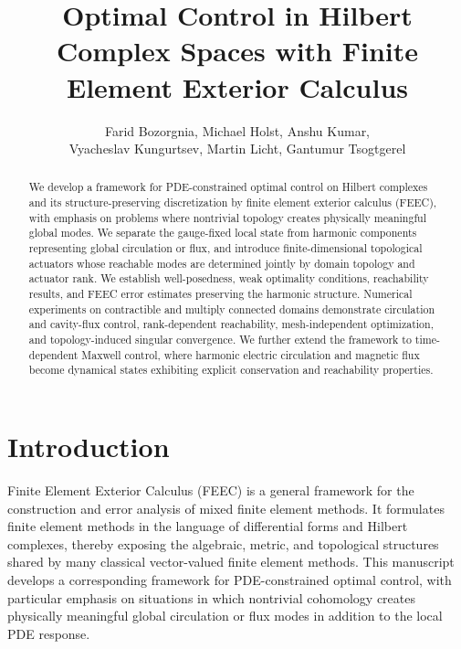 \documentclass{article}
\title{Optimal Control in Hilbert Complex Spaces with Finite Element Exterior Calculus}
\author{Farid Bozorgnia, Michael Holst, Anshu Kumar, \\ Vyacheslav Kungurtsev, Martin Licht, Gantumur Tsogtgerel}
\begin{document}
\maketitle

\begin{abstract}
We develop a framework for PDE-constrained optimal control on Hilbert complexes and its structure-preserving discretization by finite element exterior calculus (FEEC), with emphasis on problems where nontrivial topology creates physically meaningful global modes. We separate the gauge-fixed local state from harmonic components representing global circulation or flux, and introduce finite-dimensional topological actuators whose reachable modes are determined jointly by domain topology and actuator rank. We establish well-posedness, weak optimality conditions, reachability results, and FEEC error estimates preserving the harmonic structure. Numerical experiments on contractible and multiply connected domains demonstrate circulation and cavity-flux control, rank-dependent reachability, mesh-independent optimization, and topology-induced singular convergence. We further extend the framework to time-dependent Maxwell control, where harmonic electric circulation and magnetic flux become dynamical states exhibiting explicit conservation and reachability properties.
\end{abstract}

\section{Introduction}

Finite Element Exterior Calculus (FEEC) is a general framework for the construction and error analysis of mixed finite element methods.  It formulates finite element methods in the language of differential forms and Hilbert complexes, thereby exposing the algebraic, metric, and topological structures shared by many classical vector-valued finite element methods.  This manuscript develops a corresponding framework for PDE-constrained optimal control, with particular emphasis on situations in which nontrivial cohomology creates physically meaningful global circulation or flux modes in addition to the local PDE response.
\end{document}
